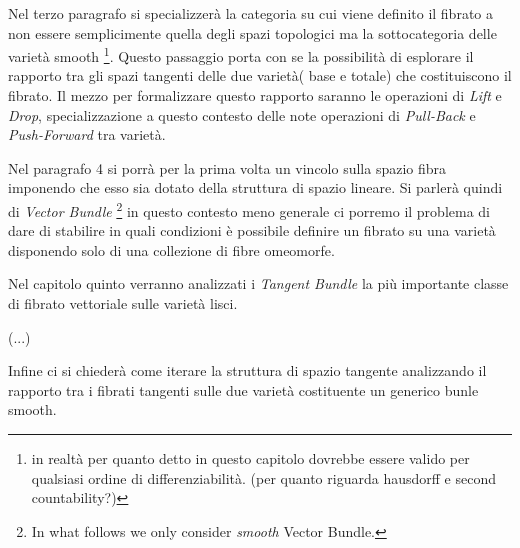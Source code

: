 \documentclass[a4paper,12pt]{scrartcl}    %
\begin{document}
Nel terzo paragrafo si specializzerà la categoria su cui viene definito il fibrato a non essere semplicimente quella degli spazi topologici ma la sottocategoria delle varietà smooth \footnote{in realtà per quanto detto in questo capitolo dovrebbe essere valido per qualsiasi ordine di differenziabilità. (per quanto riguarda hausdorff e second countability?)}.
Questo passaggio porta con se la possibilità di esplorare il rapporto tra gli spazi tangenti delle due varietà( base e totale) che costituiscono il fibrato. Il mezzo per formalizzare questo rapporto saranno le operazioni di \emph{Lift} e \emph{Drop}, specializzazione a questo contesto delle note operazioni di \emph{Pull-Back} e \emph{Push-Forward} tra varietà.

Nel paragrafo 4 si porrà per la prima volta un vincolo sulla spazio fibra imponendo che esso sia dotato 
della struttura di spazio lineare.
Si parlerà quindi di \emph{Vector Bundle} 
\footnote{In what follows we only consider \emph{smooth} Vector Bundle.} 
in questo contesto meno generale ci porremo il problema di dare di stabilire in quali condizioni è possibile definire un fibrato su una varietà disponendo solo di una collezione di fibre omeomorfe.

Nel capitolo quinto verranno analizzati i \emph{Tangent Bundle} la più importante classe di fibrato vettoriale sulle varietà lisci.

(...)

Infine ci si chiederà come iterare la struttura di spazio tangente analizzando il rapporto tra i fibrati tangenti sulle due varietà costituente un generico bunle smooth.
\end{document}
